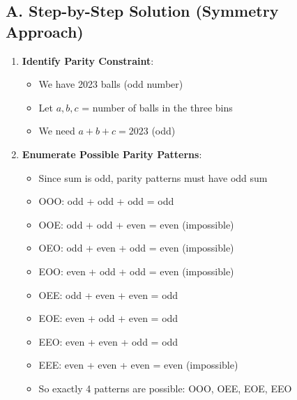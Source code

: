 \documentclass[12pt]{article}
\begin{document}
\begin{solutionbox}
\subsection*{A. Step-by-Step Solution (Symmetry Approach)}
\begin{enumerate}[leftmargin=*]
    \item \textbf{Identify Parity Constraint}: 
    \begin{itemize}
        \item We have 2023 balls (odd number)
        \item Let $a, b, c$ = number of balls in the three bins
        \item We need $a + b + c = 2023$ (odd)
    \end{itemize}
    
    \item \textbf{Enumerate Possible Parity Patterns}: 
    \begin{itemize}
        \item Since sum is odd, parity patterns must have odd sum
        \item OOO: odd + odd + odd = odd \checkmark
        \item OOE: odd + odd + even = even (impossible)
        \item OEO: odd + even + odd = even (impossible)
        \item EOO: even + odd + odd = even (impossible)
        \item OEE: odd + even + even = odd \checkmark
        \item EOE: even + odd + even = odd \checkmark
        \item EEO: even + even + odd = odd \checkmark
        \item EEE: even + even + even = even (impossible)
        \item So exactly 4 patterns are possible: OOO, OEE, EOE, EEO
    \end{itemize}
    

\end{enumerate}
\end{solutionbox}
\end{document}
